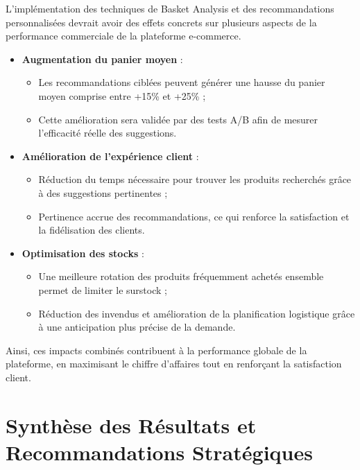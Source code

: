 \documentclass[a4paper,12pt]{article}
\begin{document}
L'implémentation des techniques de Basket Analysis et des recommandations personnalisées devrait avoir des effets concrets sur plusieurs aspects de la performance commerciale de la plateforme e-commerce.  

\begin{itemize}
    \item \textbf{Augmentation du panier moyen} :
    \begin{itemize}
        \item Les recommandations ciblées peuvent générer une hausse du panier moyen comprise entre +15\% et +25\% ;
        \item Cette amélioration sera validée par des tests A/B afin de mesurer l'efficacité réelle des suggestions.
    \end{itemize}
    \item \textbf{Amélioration de l'expérience client} :
    \begin{itemize}
        \item Réduction du temps nécessaire pour trouver les produits recherchés grâce à des suggestions pertinentes ;
        \item Pertinence accrue des recommandations, ce qui renforce la satisfaction et la fidélisation des clients.
    \end{itemize}
    \item \textbf{Optimisation des stocks} :
    \begin{itemize}
        \item Une meilleure rotation des produits fréquemment achetés ensemble permet de limiter le surstock ;
        \item Réduction des invendus et amélioration de la planification logistique grâce à une anticipation plus précise de la demande.
    \end{itemize}
\end{itemize}

Ainsi, ces impacts combinés contribuent à la performance globale de la plateforme, en maximisant le chiffre d'affaires tout en renforçant la satisfaction client.

\chapter{Synthèse des Résultats et Recommandations Stratégiques}
\end{document}
